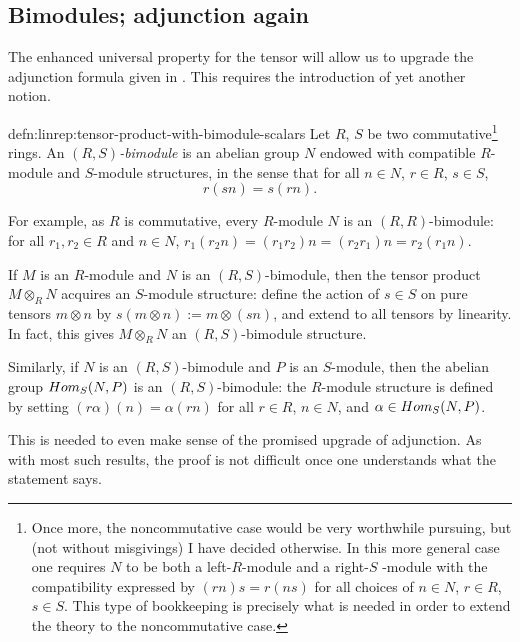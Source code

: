 \subsection{Bimodules; adjunction again}%
\label{subsec:linrep:bimodules-adjunction-again}
The enhanced universal property for the tensor will allow us to
upgrade the adjunction formula given in . This
requires the introduction of yet another notion.

\begin{defn}{}{defn:linrep:tensor-product-with-bimodule-scalars}
  Let $R$, $S$ be two commutative\footnote{Once more, the
    noncommutative case would be very worthwhile pursuing, but (not
    without misgivings) I have decided otherwise. In this more general
    case one requires $N$ to be both a left-$R$-module and a right-$S$
    -module with the compatibility expressed by $(rn)s = r(ns)$ for
    all choices of $n \in N$, $r \in R$, $s \in S$. This type of
    bookkeeping is precisely what is needed in order to extend the
    theory to the noncommutative case.} rings. An
  \emph{$(R,S)$-bimodule} is an abelian group $N$ endowed with
  compatible $R$-module and $S$-module structures, in the sense that
  for all $n \in N$, $r \in R$, $s \in S$,
  \[
    r(sn) = s(rn).
  \]
\end{defn}

For example, as $R$ is commutative, every $R$-module $N$ is an
$(R,R)$-bimodule: for all $r_1, r_2 \in R$ and $n \in N$,
$r_1(r_2 n) = (r_1 r_2)n = (r_2 r_1)n = r_2(r_1 n)$.

If $M$ is an $R$-module and $N$ is an $(R,S)$-bimodule, then the
tensor product $M \otimes_R N$ acquires an $S$-module structure:
define the action of $s \in S$ on pure tensors $m \otimes n$ by
$s(m \otimes n) := m \otimes (sn)$, and extend to all tensors by
linearity. In fact, this gives $M \otimes_R N$ an $(R,S)$-bimodule
structure.

Similarly, if $N$ is an $(R,S)$-bimodule and $P$ is an $S$-module,
then the abelian group $Hom_S(N, P)$ is an $(R,S)$-bimodule: the
$R$-module structure is defined by setting $(r\alpha)(n) = \alpha(rn)$
for all $r \in R$, $n \in N$, and $\alpha \in Hom_S(N, P)$.

This is needed to even make sense of the promised upgrade of
adjunction.  As with most such results, the proof is not difficult
once one understands what the statement says.

